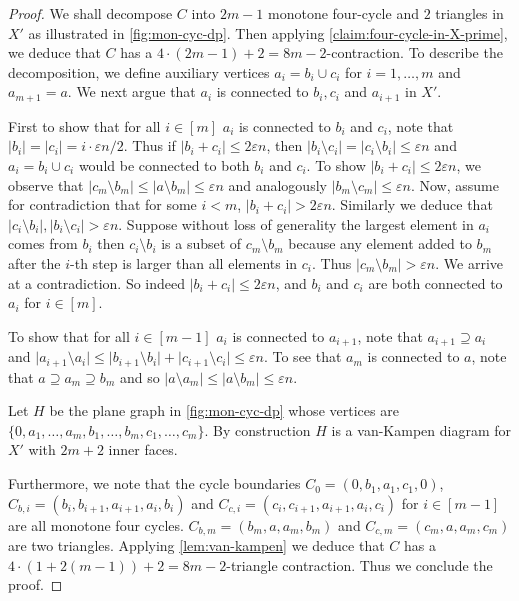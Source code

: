 \documentclass[10pt,a4paper]{article}
\newcommand{\prettyref}[1]{\cref{#1}}
\theoremstyle{definition}
\theoremstyle{remark}
\newcommand{\abs}[1]{\lvert#1\rvert}
\renewcommand{\le}{\leqslant}
\numberwithin{equation}{section}
\let\pref=\prettyref
\begin{document}
\begin{proof}
We shall decompose $C$ into $2m-1$ monotone four-cycle and $2$ triangles in $X'$ as illustrated in \pref{fig:mon-cyc-dp}. Then applying \pref{claim:four-cycle-in-X-prime}, we deduce that $C$ has a $4\cdot (2m -1 )+ 2 = 8m-2$-contraction. To describe the decomposition, we define auxiliary vertices $a_i = b_i\cup c_i$ for $i=1,\dots,m$ and $a_{m+1} = a$. We next argue that $a_i$ is connected to $b_i, c_i$ and $a_{i+1}$ in $X'$. 

First to show that for all $i\in[m]$ $a_i$ is connected to $b_i$ and $c_i$, note that $\abs{b_i} = \abs{c_i} = i\cdot \varepsilon n/2$. Thus if $\abs{b_i + c_i} \le 2\varepsilon n$, then $\abs{b_i\setminus c_i} = \abs{c_i\setminus b_i} \le \varepsilon n$ and $a_i=b_i\cup c_i$ would be connected to both $b_i$ and $c_i$. To show $\abs{b_i + c_i} \le 2\varepsilon n$, we observe that $\abs{c_m \setminus b_m} \le \abs{a\setminus b_m} \le \varepsilon n$ and analogously $\abs{b_m \setminus c_m} \le \varepsilon n$. Now, assume for contradiction that for some $i< m$, $\abs{b_i + c_i} > 2\varepsilon n$. Similarly we deduce that $\abs{c_i \setminus b_i} , \abs{b_i \setminus c_i} > \varepsilon n$. Suppose without loss of generality the largest element in $a_i$ comes from $b_i$ then $c_i\setminus b_i$ is a subset of $c_m \setminus b_m$ because any element added to \(b_m\) after the $i$-th step is larger than all elements in \(c_i\). Thus $\abs{c_m \setminus b_m}> \varepsilon n$. We arrive at a contradiction. So indeed $\abs{b_i + c_i} \le 2\varepsilon n$, and $b_i$ and $c_i$ are both connected to $a_i$ for $i\in[m]$.

To show that for all $i\in[m-1]$ $a_i$ is connected to $a_{i+1}$, note that $a_{i+1} \supseteq a_i$ and $\abs{a_{i+1}\setminus a_i} \le \abs{b_{i+1}\setminus b_i} + \abs{c_{i+1}\setminus c_i} \le \varepsilon n$. 
To see that $a_m$ is connected to $a$, note that $a \supseteq a_m \supseteq b_m$ and so $\abs{a\setminus a_m} \le \abs{a\setminus b_m}\le \varepsilon n$. 

Let $H$ be the plane graph in \pref{fig:mon-cyc-dp} whose vertices are $\{0,a_1,\dots,a_m,b_1,\dots, b_m, c_1,\dots, c_m\}$. By construction $H$ is a van-Kampen diagram for $X'$ with $2m+2$ inner faces. 

Furthermore, we note that the cycle boundaries $C_0 = (0,b_1,a_1,c_1,0)$, $C_{b,i} = (b_i,b_{i+1},a_{i+1},a_i,b_i)$ and $C_{c,i} = (c_i,c_{i+1},a_{i+1},a_i,c_i)$ for $i\in [m-1]$ are all monotone four cycles. $C_{b,m} =(b_m,a,a_m,b_m)$ and $C_{c,m} = (c_m,a,a_m,c_m)$ are two triangles. Applying \pref{lem:van-kampen} we deduce that $C$ has a $4\cdot (1+2(m-1)) + 2 = 8m - 2$-triangle contraction. Thus we conclude the proof.

    

\end{proof}
\end{document}
